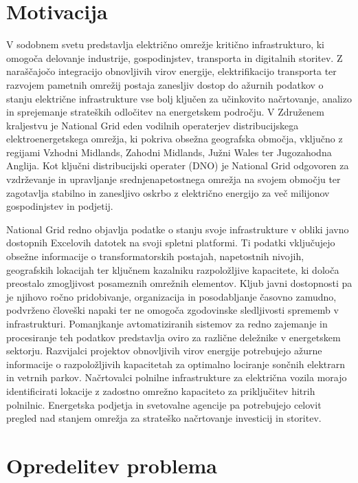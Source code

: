 \documentclass[a4paper,12pt,openright]{book}
\begin{document}
\section{Motivacija}

V sodobnem svetu predstavlja električno omrežje kritično infrastrukturo, ki omogoča delovanje industrije, gospodinjstev, transporta in digitalnih storitev. Z naraščajočo integracijo obnovljivih virov energije, elektrifikacijo transporta ter razvojem pametnih omrežij postaja zanesljiv dostop do ažurnih podatkov o stanju električne infrastrukture vse bolj ključen za učinkovito načrtovanje, analizo in sprejemanje strateških odločitev na energetskem področju. V Združenem kraljestvu je National Grid \cite{nationalgrid2026} eden vodilnih operaterjev distribucijskega elektroenergetskega omrežja, ki pokriva obsežna geografska območja, vključno z regijami Vzhodni Midlands, Zahodni Midlands, Južni Wales ter Jugozahodna Anglija. Kot ključni distribucijski operater (DNO) je National Grid odgovoren za vzdrževanje in upravljanje srednjenapetostnega omrežja na svojem območju ter zagotavlja stabilno in zanesljivo oskrbo z električno energijo za več milijonov gospodinjstev in podjetij.

National Grid redno objavlja podatke o stanju svoje infrastrukture v obliki javno dostopnih Excelovih datotek na svoji spletni platformi. Ti podatki vključujejo obsežne informacije o transformatorskih postajah, napetostnih nivojih, geografskih lokacijah ter ključnem kazalniku razpoložljive kapacitete, ki določa preostalo zmogljivost posameznih omrežnih elementov. Kljub javni dostopnosti pa je njihovo ročno pridobivanje, organizacija in posodabljanje časovno zamudno, podvrženo človeški napaki ter ne omogoča zgodovinske sledljivosti sprememb v infrastrukturi. Pomanjkanje avtomatiziranih sistemov za redno zajemanje in procesiranje teh podatkov predstavlja oviro za različne deležnike v energetskem sektorju. Razvijalci projektov obnovljivih virov energije potrebujejo ažurne informacije o razpoložljivih kapacitetah za optimalno lociranje sončnih elektrarn in vetrnih parkov. Načrtovalci polnilne infrastrukture za električna vozila morajo identificirati lokacije z zadostno omrežno kapaciteto za priključitev hitrih polnilnic. Energetska podjetja in svetovalne agencije pa potrebujejo celovit pregled nad stanjem omrežja za strateško načrtovanje investicij in storitev.

\section{Opredelitev problema}
\end{document}
